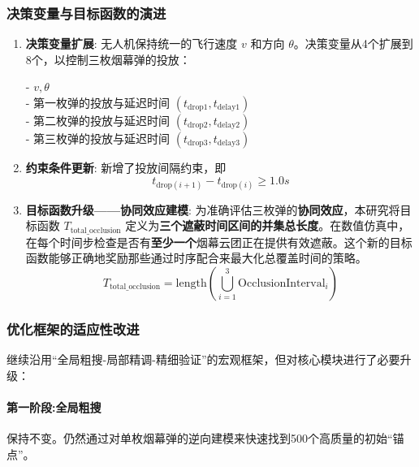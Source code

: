 \documentclass[12pt]{article}
\begin{document}
\begin{CJK}{UTF8}{gbsn}
		\subsubsection{决策变量与目标函数的演进}
		
		\begin{enumerate}
			\item \textbf{决策变量扩展}: 无人机保持统一的飞行速度 $v$ 和方向 $\theta$。决策变量从4个扩展到8个，以控制三枚烟幕弹的投放：
			
			- $v, \theta$\\
			\indent - 第一枚弹的投放与延迟时间 $(t_{\text{drop1}}, t_{\text{delay1}})$\\
			\indent - 第二枚弹的投放与延迟时间 $(t_{\text{drop2}}, t_{\text{delay2}})$\\
			\indent - 第三枚弹的投放与延迟时间 $(t_{\text{drop3}}, t_{\text{delay3}})$
			
			\item \textbf{约束条件更新}: 新增了投放间隔约束，即
			\begin{equation}
				t_{\text{drop}(i+1)} - t_{\text{drop}(i)} \ge 1.0 s
			\end{equation}
			
			\item \textbf{目标函数升级——协同效应建模}:
			为准确评估三枚弹的\textbf{协同效应}，本研究将目标函数 $T_{\text{total\_occlusion}}$ 定义为\textbf{三个遮蔽时间区间的并集总长度}。在数值仿真中，在每个时间步检查是否有\textbf{至少一个}烟幕云团正在提供有效遮蔽。这个新的目标函数能够正确地奖励那些通过时序配合来最大化总覆盖时间的策略。
			\begin{equation}
				T_{\text{total\_occlusion}} = \text{length} \left( \bigcup_{i=1}^{3} \text{OcclusionInterval}_i \right)
			\end{equation}
			
		\end{enumerate}
		
		\subsubsection{优化框架的适应性改进}
		继续沿用“全局粗搜-局部精调-精细验证”的宏观框架，但对核心模块进行了必要升级：
		
		\paragraph{第一阶段:全局粗搜} 保持不变。仍然通过对单枚烟幕弹的逆向建模来快速找到500个高质量的初始“锚点”。
		

\end{CJK}
\end{document}
